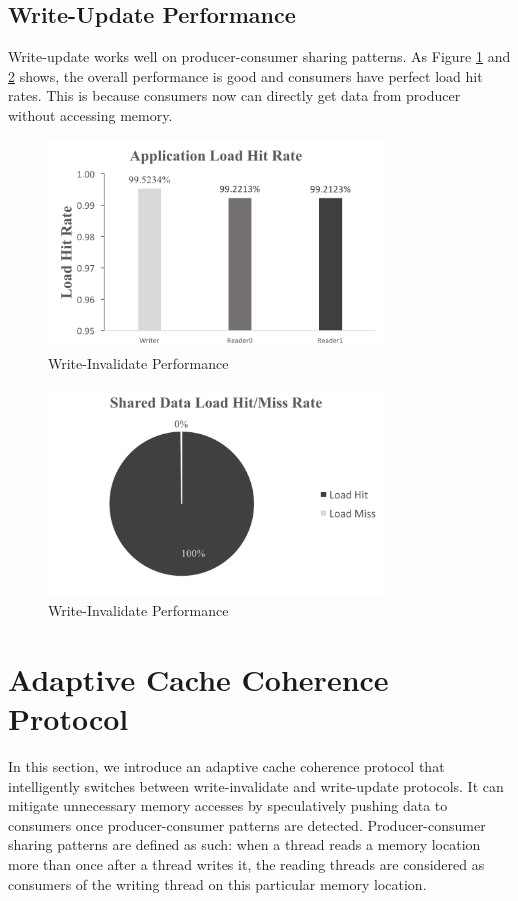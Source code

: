 \documentclass[conference]{IEEEtran}
\begin{document}
\subsection{Write-Update Performance}
Write-update works well on producer-consumer sharing patterns. As Figure \ref{write_update} and \ref{write_update_1} shows, the overall performance is good and consumers have perfect load hit rates. This is because consumers now can directly get data from producer without accessing memory.

\begin{figure}[!h]
\centering
\includegraphics[width=3.5in]{write_update.png}
\caption{Write-Invalidate Performance}
\label{write_update}
\end{figure}
\FloatBarrier

\begin{figure}[!h]
\centering
\includegraphics[width=3.5in]{write_update_1.png}
\caption{Write-Invalidate Performance}
\label{write_update_1}
\end{figure}
\FloatBarrier

\newpage

\section{Adaptive Cache Coherence Protocol}
In this section, we introduce an adaptive cache coherence protocol that intelligently switches between write-invalidate and write-update protocols. It can mitigate unnecessary memory accesses by speculatively pushing data to consumers once producer-consumer patterns are detected. Producer-consumer sharing patterns are defined as such: when a thread reads a memory location more than once after a thread writes it, the reading threads are considered as consumers of the writing thread on this particular memory location.
\end{document}
